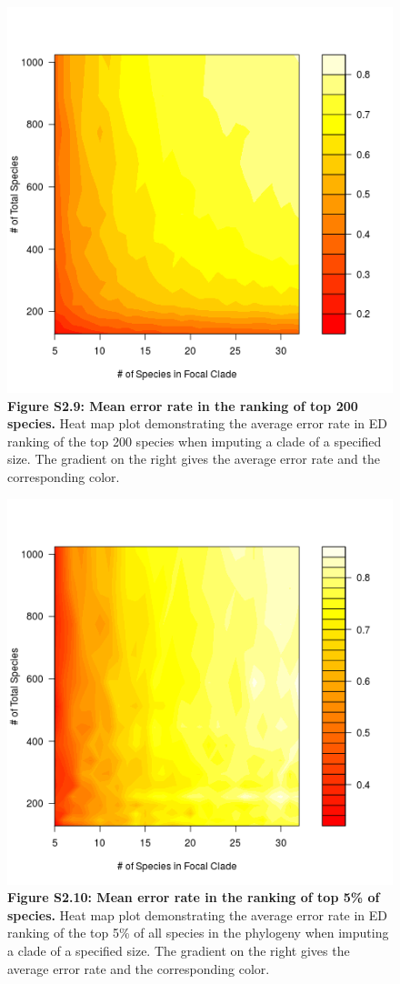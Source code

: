 \documentclass[10pt,english]{article}
\begin{document}
\begin{figure}[!ht]
  \center
  \includegraphics[width=.5\textwidth]{../figures/errorRate200.png}
  \caption*{\textbf{Figure S2.9: Mean error rate in the ranking of top 200
  species.} Heat map plot demonstrating the average error rate in ED ranking of
  the top 200 species when imputing a clade of a specified size. The gradient on
  the right gives the average error rate and the corresponding color.}
\end{figure}

\begin{figure}[!ht]
  \center
  \includegraphics[width=.5\textwidth]{../figures/errorRate5pct.png}
  \caption*{\textbf{Figure S2.10: Mean error rate in the ranking of top 5\% of
  species.} Heat map plot demonstrating the average error rate in ED ranking of
  the top 5\% of all species in the phylogeny when imputing a clade of a
  specified size. The gradient on the right gives the average error rate and the
  corresponding color.}
\end{figure}
\end{document}

